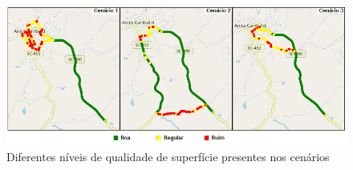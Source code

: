 \begin{figure}[h]
  \centering
  \caption{Diferentes níveis de qualidade de superfície presentes nos cenários}
   \label{fig:qualidade_superficies_mapa}
   \includegraphics[width=1\textwidth]{figuras/fig_27.png}
\end{figure}

